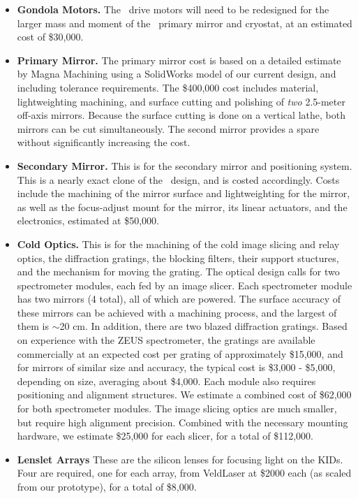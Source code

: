 \begin{itemize}
\begin{itemize}
\item
{\bf Gondola Motors.}  The \blast\ drive motors will need to be
redesigned for the larger mass and moment of the \name\ primary
mirror and cryostat, at an estimated cost of \$30,000.

\item
{\bf Primary Mirror.}  The primary mirror cost is based on a detailed estimate by
Magna Machining using a SolidWorks model of our current design, and including tolerance requirements.  The \$400,000 cost includes material, lightweighting machining, and surface cutting and polishing of {\it two} 2.5-meter off-axis mirrors.  Because the surface cutting is done on a vertical lathe, both mirrors can be cut simultaneously.  The second mirror provides a spare without significantly increasing the cost.

\item
{\bf Secondary Mirror.}  This is for the secondary mirror and
positioning system.  This is a nearly exact clone of the \blast\
design, and is costed accordingly.  Costs include the machining of the
mirror surface and lightweighting for the mirror, as well as the
focus-adjust mount for the mirror, its linear actuators, and the
electronics, estimated at \$50,000.

\item
{\bf Cold Optics.}  This is for the machining of the cold image slicing and relay optics, the diffraction gratings, the blocking filters, their support stuctures, and the mechanism for moving the grating.  The optical design calls for two spectrometer modules, each fed by an image slicer.  
Each spectrometer module has two mirrors (4 total), all of which are powered.  The surface accuracy of these mirrors can be
achieved with a machining process, and the largest of them is $\sim$20
cm.  In addition, there are two blazed diffraction gratings.  Based
on experience with the ZEUS spectrometer, the gratings are available
commercially at an expected cost per grating of approximately
\$15,000, and for mirrors of similar size and accuracy, the typical
cost is \$3,000 - \$5,000, depending on size, averaging about \$4,000.  Each module also requires positioning and alignment structures.  We estimate a combined cost of \$62,000 for both spectrometer modules.  The image slicing optics are much smaller, but require high alignment precision.  Combined with the necessary mounting hardware, we estimate \$25,000 for each slicer, for a total of 
\$112,000.

\item {\bf Lenslet Arrays}  These are the silicon lenses for focusing light on the KIDs.  Four are required, one for each array, from  VeldLaser at \$2000 each (as scaled from our prototype), for a total of \$8,000.


\end{itemize}
\end{itemize}
